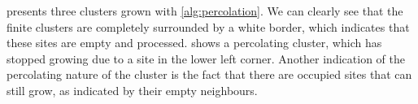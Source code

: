  presents three clusters grown with \cref{alg:percolation}. We can clearly see that the finite clusters are completely surrounded by a white border, which indicates that these sites are empty and processed.  shows a percolating cluster, which has stopped growing due to a site in the lower left corner.
Another indication of the percolating nature of the cluster is the fact that there are occupied sites that can still grow, as indicated by their empty neighbours.

